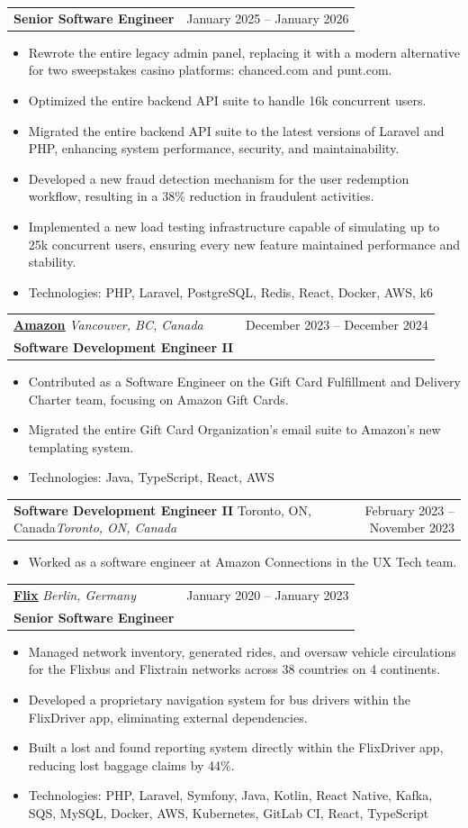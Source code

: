 \documentclass[a4paper,11pt]{article}
\makeatletter
\newcommand{\resumeSubheading}[4]{
    \vspace{1.6pt}\item
        \begin{tabular*}{0.97\textwidth}[t]{l@{\extracolsep{\fill}}r}
            \textbf{\large{\underline{#1}}} \footnotesize{\textit{#4}} & #2 \\[3pt]
            \textbf{#3}
        \end{tabular*}\vspace{-7pt}
}
\newcommand{\resumeSubSubheading}[3]{
    \vspace{-2pt}\item
        \begin{tabular*}{0.97\textwidth}{l@{\extracolsep{\fill}}r}
            \textbf{#1} \ifx\relax#2\relax\else\small{\textit{#2}}\fi & #3 \\
        \end{tabular*}\vspace{-7pt}
}
\newcommand{\resumeItemListStart}{\begin{itemize}}
\newcommand{\resumeItemListEnd}{\end{itemize}\vspace{-5pt}}
\newcommand{\resumeItem}[1]{
    \item\small{
        {#1 \vspace{-2pt}}
    }
}
\makeatother
\begin{document}
        \resumeSubSubheading
            {Senior Software Engineer}{}{January 2025 -- January 2026}
            \resumeItemListStart
                \resumeItem{Rewrote the entire legacy admin panel, replacing it with a modern alternative for two sweepstakes casino platforms: chanced.com and punt.com.}
                \resumeItem{Optimized the entire backend API suite to handle 16k concurrent users.}
                \resumeItem{Migrated the entire backend API suite to the latest versions of Laravel and PHP, enhancing system performance, security, and maintainability.}
                \resumeItem{Developed a new fraud detection mechanism for the user redemption workflow, resulting in a 38\% reduction in fraudulent activities.}
                \resumeItem{Implemented a new load testing infrastructure capable of simulating up to 25k concurrent users, ensuring every new feature maintained performance and stability.}
                \resumeItem{Technologies: PHP, Laravel, PostgreSQL, Redis, React, Docker, AWS, k6}
            \resumeItemListEnd
        
        \resumeSubheading
            {\href{https://amazon.com}{Amazon}} {December 2023 -- December 2024}
            {Software Development Engineer II}{Vancouver, BC, Canada}
            \resumeItemListStart
                \resumeItem{Contributed as a Software Engineer on the Gift Card Fulfillment and Delivery Charter team, focusing on Amazon Gift Cards.}
                \resumeItem{Migrated the entire Gift Card Organization's email suite to Amazon's new templating system.}
                \resumeItem{Technologies: Java, TypeScript, React, AWS}
            \resumeItemListEnd

        \resumeSubSubheading
            {Software Development Engineer II}{Toronto, ON, Canada}{February 2023 -- November 2023}
            \resumeItemListStart
                \resumeItem{Worked as a software engineer at Amazon Connections in the UX Tech team.}
            \resumeItemListEnd

        \resumeSubheading
            {\href{https://flix.com}{Flix}} {January 2020 -- January 2023}
            {Senior Software Engineer}{Berlin, Germany}
            \resumeItemListStart
                \resumeItem{Managed network inventory, generated rides, and oversaw vehicle circulations for the Flixbus and Flixtrain networks across 38 countries on 4 continents.}
                \resumeItem{Developed a proprietary navigation system for bus drivers within the FlixDriver app, eliminating external dependencies.}
                \resumeItem{Built a lost and found reporting system directly within the FlixDriver app, reducing lost baggage claims by 44\%.}
                \resumeItem{Technologies: PHP, Laravel, Symfony, Java, Kotlin, React Native, Kafka, SQS, MySQL, Docker, AWS, Kubernetes, GitLab CI, React, TypeScript}
            \resumeItemListEnd
            
\end{document}
